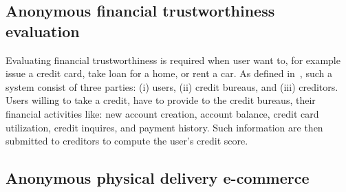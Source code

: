 \documentclass{article}
\begin{document}
\subsection{Anonymous financial trustworthiness evaluation}

Evaluating financial trustworthiness is required when user want to, for example issue a credit card, take loan for a home, or rent a car. 
As defined in~\cite{lin2021efficient}, such a system consist of three parties: (i) users, (ii) credit bureaus, and (iii) creditors. Users willing to take a credit, have to provide to the credit bureaus, their financial activities like: new account creation, account balance, credit card utilization, credit inquires, and payment history. Such information are then submitted to creditors to compute the user's credit score. 

\subsection{Anonymous physical delivery e-commerce}
~\cite{birjoveanu2015anonymity}
\end{document}
